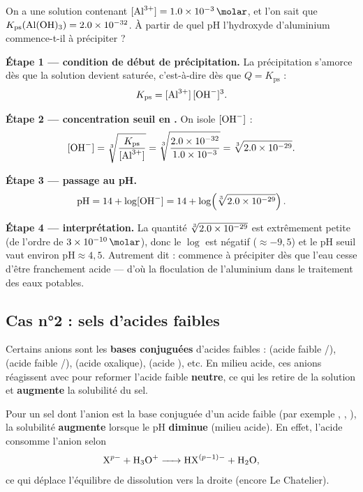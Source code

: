 \documentclass[11pt,a4paper]{article}
\newcommand{\Kps}{K_{\mathrm{ps}}}
\begin{document}
\begin{exemple}
On a une solution contenant $[\ce{Al^{3+}}]=\qty{1{,}0e-3}{\molar}$, et l'on sait que
$\Kps(\ce{Al(OH)3})=\num{2{,}0e-32}$. À partir de quel pH l'hydroxyde d'aluminium commence-t-il à
précipiter ?

\smallskip
\textbf{Étape 1 — condition de début de précipitation.} La précipitation s'amorce dès que la solution
devient saturée, c'est-à-dire dès que $Q=\Kps$ :
\[ \Kps = [\ce{Al^{3+}}]\,[\ce{OH-}]^{3}. \]

\textbf{Étape 2 — concentration seuil en .} On isole $[\ce{OH-}]$ :
\[ [\ce{OH-}] = \sqrt[3]{\dfrac{\Kps}{[\ce{Al^{3+}}]}}
              = \sqrt[3]{\dfrac{\num{2{,}0e-32}}{\num{1{,}0e-3}}}
              = \sqrt[3]{\num{2{,}0e-29}}. \]

\textbf{Étape 3 — passage au pH.}
\[ \mathrm{pH} = 14 + \log[\ce{OH-}]
               = 14 + \log\!\left(\sqrt[3]{\num{2{,}0e-29}}\right). \]

\textbf{Étape 4 — interprétation.} La quantité $\sqrt[3]{\num{2{,}0e-29}}$ est extrêmement petite
(de l'ordre de $\qty{3e-10}{\molar}$), donc le $\log$ est négatif ($\approx -9{,}5$) et le pH seuil
vaut environ $\mathrm{pH}\approx 4{,}5$. Autrement dit :  commence à précipiter dès que
l'eau cesse d'être franchement acide — d'où la floculation de l'aluminium dans le traitement des eaux
potables.
\end{exemple}

\subsection{Cas n°2 : sels d'acides faibles}

Certains anions sont les \textbf{bases conjuguées} d'acides faibles :  (acide faible
/),  (acide faible /),  (acide oxalique),
 (acide ), etc. En milieu acide, ces anions réagissent avec  pour reformer
l'acide faible \textbf{neutre}, ce qui les retire de la solution et \textbf{augmente} la solubilité
du sel.

\begin{theoreme}
Pour un sel dont l'anion est la base conjuguée d'un acide faible (par exemple ,
, ), la solubilité \textbf{augmente} lorsque le pH \textbf{diminue} (milieu
acide). En effet, l'acide  consomme l'anion selon
\[ \ce{X^{p-} + H3O+ -> HX^{(p-1)-} + H2O}, \]
ce qui déplace l'équilibre de dissolution vers la droite (encore Le Chatelier).
\end{theoreme}
\end{document}

